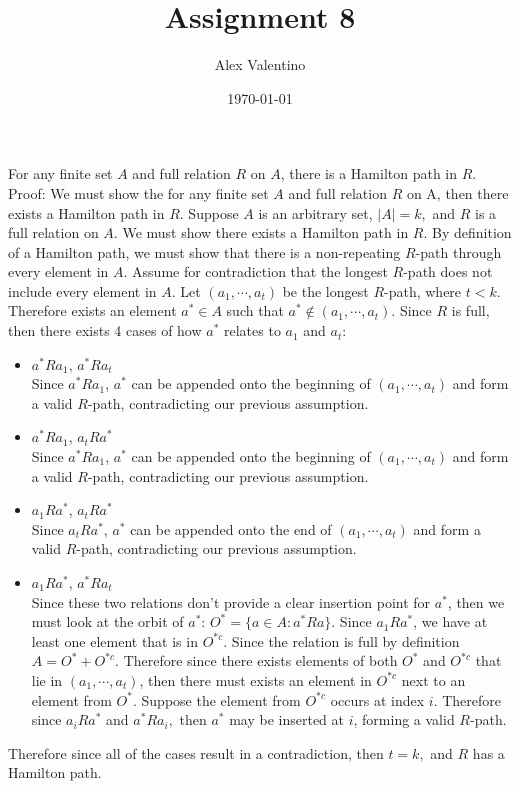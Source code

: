 \documentclass[12pt, letterpaper]{article}
\date{\today}
\author{Alex Valentino}
\title{Assignment 8}
\begin{document}
	For any finite set $A$ and full relation $R$ on $A$, there 
 is a Hamilton path in $R$.\\
 	Proof:  We must show the for any finite set $A$ and full relation $R$ on A, then there exists a Hamilton path in $R$.  Suppose $A$ is an arbitrary set, $|A| = k,$ and $R$ is a full relation on $A$.  We must show there exists a Hamilton path in $R$.  By definition of a Hamilton path, we must show that there is a non-repeating $R$-path through every element in $A$.  Assume for contradiction that the longest $R$-path does not include every element in $A$.  Let $(a_1,\cdots,a_t)$ be the longest $R$-path, where $t < k.$  Therefore exists an element $a^* \in A$ such that $a^* \not \in (a_1,\cdots,a_t).$   Since $R$ is full, then there exists 4 cases of how $a^*$ relates to $a_1$ and $a_t$:
 	\begin{itemize}
 		\item $a^* R a_1$, $a^* R a_t$\\
 		Since $a^* R a_1$, $a^*$ can be appended onto the beginning of $(a_1,\cdots, a_t)$ and form a valid $R$-path, contradicting our previous assumption.
 		\item $a^* R a_1$, $ a_tRa^*$\\
 		Since $a^* R a_1$, $a^*$ can be appended onto the beginning of $(a_1,\cdots, a_t)$ and form a valid $R$-path, contradicting our previous assumption.
 		\item $a_1 R a^*$, $a_t R a^*$\\
 		Since $a_t R a^*$, $a^*$ can be appended onto the end of $(a_1,\cdots, a_t)$ and form a valid $R$-path, contradicting our previous assumption.
 		\item $a_1 R a^*$, $a^* R a_t$\\
 		Since these two relations don't provide a clear insertion point for $a^*$, then we must look at the orbit of $a^*$: $O^* = \{a \in A: a^* R a\}$.  Since $a_1 R a^*$, we have at least one element that is in $O^{*c}.$  Since the relation is full by definition $A= O^* + O^{*c}.$  Therefore since there exists elements of both $O^*$ and $O^{*c}$ that lie in $(a_1,\cdots, a_t)$, then there must exists an element in $O^{*c}$ next to an element from $O^*.$  Suppose the element from $O^{*c}$ occurs at index $i.$  Therefore since $a_{i} R a^*$ and $a^* R a_i,$ then $a^*$ may be inserted at $i$, forming a valid $R$-path. 	
 	\end{itemize}
 	Therefore since all of the cases result in a contradiction, then $t=k,$ and $R$ has a Hamilton path.  
\end{document}
